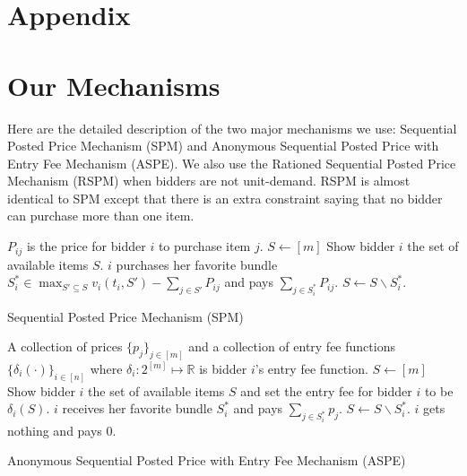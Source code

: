 \section*{\huge{Appendix}}
\section{Our Mechanisms}

Here are the detailed description of the two major mechanisms we use: Sequential Posted Price Mechanism (SPM) and Anonymous Sequential Posted Price with Entry Fee Mechanism (ASPE). We also use the Rationed Sequential Posted Price Mechanism (RSPM) when bidders are not unit-demand. RSPM is almost identical to SPM except that there is an extra constraint saying that no bidder can purchase more than one item.
\begin{algorithm}[ht]
\begin{algorithmic}[1]
\REQUIRE $P_{ij}$ is the price for bidder $i$ to purchase item $j$.
\STATE $S\gets [m]$
	\STATE Show bidder $i$ {the} set of available items $S$.
	 \STATE $i$ purchases her favorite bundle $S_i^{*}\in \max_{S'\subseteq S} v_i(t_i, S') - \sum_{j\in S'} P_{ij}$ and pays $\sum_{j\in S_i^{*}}P_{ij}$.
        \STATE $S\gets S\backslash S_i^{*}$.
\ENDFOR
\end{algorithmic}
\caption{{\sf Sequential Posted Price Mechanism (SPM)}}
\label{alg:seq-mech}
\end{algorithm} 

\begin{algorithm}[ht]
\begin{algorithmic}[1]
\REQUIRE A collection of prices $\{p_{j}\}_{j\in[m]}$ and a collection of entry fee functions $\{\delta_i(\cdot)\}_{i\in[n]}$ where $\delta_i: 2^{[m]}\mapsto \mathbb{R}$ is bidder $i$'s entry fee function.
\STATE $S\gets [m]$
	\STATE Show bidder $i$ {the} set of available items $S$ and set the entry fee for bidder $i$ to be ${\delta_i}(S)$.
        \STATE $i$ receives her favorite bundle $S_i^{*}$ and pays $\sum_{j\in S_i^{*}}p_{j}$.
        \STATE $S\gets S\backslash S_i^{*}$.
    \ELSE
        \STATE $i$ gets nothing and pays $0$.
    \ENDIF
\ENDFOR
\end{algorithmic}
\caption{{\sf Anonymous Sequential Posted Price with Entry Fee Mechanism (ASPE)}}
\label{alg:aspe-mech}
\end{algorithm} 




